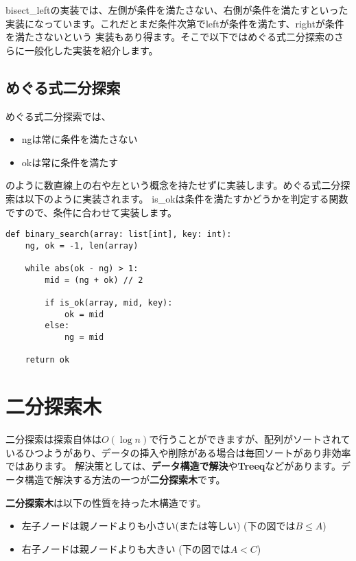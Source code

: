 bisect\_leftの実装では、左側が条件を満たさない、右側が条件を満たすといった実装になっています。これだとまだ条件次第でleftが条件を満たす、rightが条件を満たさないという
実装もあり得ます。そこで以下ではめぐる式二分探索のさらに一般化した実装を紹介します。

\subsection{めぐる式二分探索}

めぐる式二分探索では、

\begin{itemize}
  \item ngは常に条件を満たさない
  \item okは常に条件を満たす
\end{itemize}

のように数直線上の右や左という概念を持たせずに実装します。めぐる式二分探索は以下のように実装されます。
is\_okは条件を満たすかどうかを判定する関数ですので、条件に合わせて実装します。

\begin{lstlisting}[caption=めぐる式二分探索, frame=TRBL, label={megru}]
def binary_search(array: list[int], key: int):
    ng, ok = -1, len(array)
    
    while abs(ok - ng) > 1:
        mid = (ng + ok) // 2
        
        if is_ok(array, mid, key):
            ok = mid
        else:
            ng = mid
    
    return ok
\end{lstlisting}

\newpage

\section{二分探索木}
二分探索は探索自体は$O(\log n)$で行うことができますが、配列がソートされているひつようがあり、データの挿入や削除がある場合は毎回ソートがあり非効率ではあります。
解決策としては、\textbf{データ構造で解決}や\textbf{Treeq}などがあります。データ構造で解決する方法の一つが\textbf{二分探索木}です。

\textbf{二分探索木}は以下の性質を持った木構造です。

\begin{itemize}
  \item 左子ノードは親ノードよりも小さい(または等しい) (下の図では$B \leq A$)
  \item 右子ノードは親ノードよりも大きい (下の図では$A < C$)
\end{itemize}

